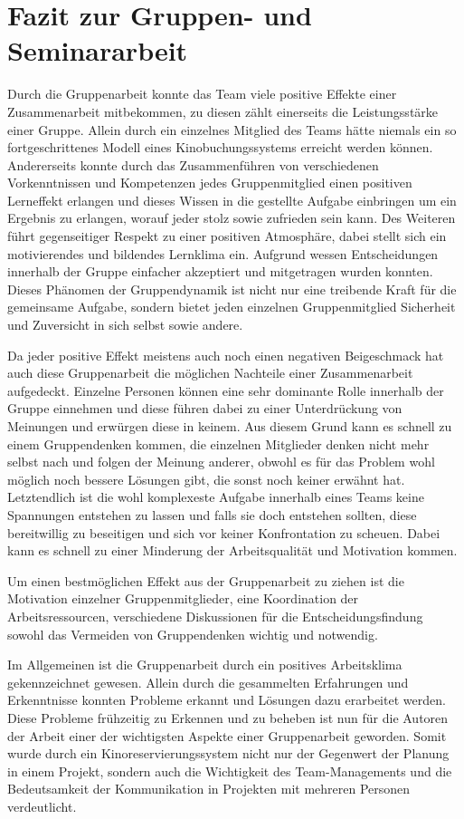 \section{Fazit zur Gruppen- und Seminararbeit}
\multipleauthorsection{\authorRF}{\authorEJ}

Durch die Gruppenarbeit konnte das Team viele positive Effekte einer Zusammenarbeit mitbekommen, zu diesen zählt einerseits die Leistungsstärke einer Gruppe.
Allein durch ein einzelnes Mitglied des Teams hätte niemals ein so fortgeschrittenes Modell eines Kinobuchungssystems erreicht werden können.
Andererseits konnte durch das Zusammenführen von verschiedenen Vorkenntnissen und Kompetenzen jedes Gruppenmitglied einen positiven Lerneffekt erlangen und dieses Wissen in die gestellte Aufgabe einbringen um ein Ergebnis zu erlangen, worauf jeder stolz sowie zufrieden sein kann.
Des Weiteren führt gegenseitiger Respekt zu einer positiven Atmosphäre, dabei stellt sich ein motivierendes und bildendes Lernklima ein.
Aufgrund wessen Entscheidungen innerhalb der Gruppe einfacher akzeptiert und mitgetragen wurden konnten.
Dieses Phänomen der Gruppendynamik ist nicht nur eine treibende Kraft für die gemeinsame Aufgabe, sondern bietet jeden einzelnen Gruppenmitglied Sicherheit und Zuversicht in sich selbst sowie andere.

Da jeder positive Effekt meistens auch noch einen negativen Beigeschmack hat auch diese Gruppenarbeit die möglichen Nachteile einer Zusammenarbeit aufgedeckt.
Einzelne Personen können eine sehr dominante Rolle innerhalb der Gruppe einnehmen und diese führen dabei zu einer Unterdrückung von Meinungen und erwürgen diese in keinem. 
Aus diesem Grund kann es schnell zu einem Gruppendenken kommen, die einzelnen Mitglieder denken nicht mehr selbst nach und folgen der Meinung anderer, obwohl es für das Problem wohl möglich noch bessere Lösungen gibt, die sonst noch keiner erwähnt hat.
Letztendlich ist die wohl komplexeste Aufgabe innerhalb eines Teams keine Spannungen entstehen zu lassen und falls sie doch entstehen sollten, diese bereitwillig zu beseitigen und sich vor keiner Konfrontation zu scheuen.
Dabei kann es schnell zu einer Minderung der Arbeitsqualität und Motivation kommen. 

Um einen bestmöglichen Effekt aus der Gruppenarbeit zu ziehen ist die Motivation einzelner Gruppenmitglieder, eine Koordination der Arbeitsressourcen, verschiedene Diskussionen für die Entscheidungsfindung sowohl das Vermeiden von Gruppendenken wichtig und notwendig.


Im Allgemeinen ist die Gruppenarbeit durch ein positives Arbeitsklima gekennzeichnet gewesen.
Allein durch die gesammelten Erfahrungen und Erkenntnisse konnten Probleme erkannt und Lösungen dazu erarbeitet werden.
Diese Probleme frühzeitig zu Erkennen und zu beheben ist nun für die Autoren der Arbeit einer der wichtigsten Aspekte einer Gruppenarbeit geworden.
Somit wurde durch ein Kinoreservierungssystem nicht nur der Gegenwert der Planung in einem Projekt, sondern auch die Wichtigkeit des Team-Managements und die Bedeutsamkeit der Kommunikation in Projekten mit mehreren Personen verdeutlicht.

